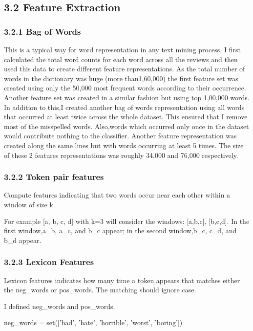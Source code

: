 \documentclass[11pt]{article}
\begin{document}
\subsection*{3.2 Feature Extraction}
\subsubsection*{3.2.1 Bag of Words}
\hspace{1.5em}This is a typical way for word representation in any text mining process. I first calculated the total word counts for each word across all the reviews and then used this data to create different feature representations. As the total number of words in the dictionary was huge (more than1,60,000) the first feature set was created using only the 50,000 most frequent words according to their occurrence. Another feature set was created in a similar fashion but using top 1,00,000 words. In addition to this,I created another bag of words representation using all words that occurred at least twice across the whole dataset. This ensured that I remove most of the misspelled words. Also,words which occurred only once in the dataset would contribute nothing to the classifier. Another feature representation was created along the same lines but with words occurring at least 5 times. The size of these 2 features representations was roughly 34,000 and 76,000 respectively. 
\subsubsection*{3.2.2 Token pair features}
\hspace{1.5em}Compute features indicating that two words occur near each other within a window of size k. 

For example [a, b, c, d] with k=3 will consider the windows: [a,b,c], [b,c,d]. In the first window,a\_b, a\_c, and b\_c appear; in the second window,b\_c, c\_d, and b\_d appear. 
\subsubsection*{3.2.3 Lexicon Features}
\hspace{1.5em}Lexicon features indicates how many time a token appears that matches either the neg\_words or pos\_words. The matching should ignore case.

I defined neg\_words and pos\_words.

neg\_words = set(['bad', 'hate', 'horrible', 'worst', 'boring'])
\end{document}
